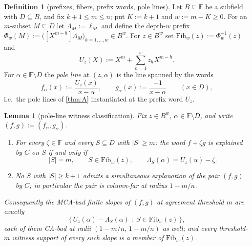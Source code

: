 \documentclass[11pt]{article}
\newtheorem{lemma}[lemma]{Lemma}
\theoremstyle{definition}
\newtheorem{definition}[definition]{Definition}
\theoremstyle{remark}
\newcommand{\F}{\mathbb{F}}
\begin{document}
\begin{definition}[prefixes, fibers, prefix words, pole lines]\label{def:capg-prefix}
Let $B\subseteq\F$ be a subfield with $D\subseteq B$, and fix
$k+1\leq m\leq n$; put $K:=k+1$ and $w:=m-K\geq 0$.  For an $m$-subset
$M\subseteq D$ let $\Lambda_M:=\ell_M$ and define the depth-$w$ prefix
$\Phi_w(M):=\big([X^{m-h}]\Lambda_M\big)_{h=1,\dots,w}\in B^{w}$.  For
$z\in B^{w}$ set $\mathrm{Fib}_w(z):=\Phi_w^{-1}(z)$ and
\[
U_z(X):=X^{m}+\textstyle\sum_{h=1}^{w}z_hX^{m-h}.
\]
For $\alpha\in\F\setminus D$ the \emph{pole line} at $(z,\alpha)$ is the
line spanned by the words
\[
f_\alpha(x):=\frac{U_z(x)}{x-\alpha},\qquad
g_\alpha(x):=\frac{-1}{x-\alpha}\qquad(x\in D),
\]
i.e.\ the pole lines of \cref{thm:A} instantiated at the prefix word $U_z$.
\end{definition}

\begin{lemma}[pole-line witness classification]\label{lem:capg-witness}
Fix $z\in B^{w}$, $\alpha\in\F\setminus D$, and write
$(f,g):=(f_\alpha,g_\alpha)$.
\begin{enumerate}[label=(\roman*)]
\item For every $\zeta\in\F$ and every $S\subseteq D$ with $|S|\geq m$: the
word $f+\zeta g$ is explained by $C$ on $S$ if and only if
\[
|S|=m,\qquad S\in\mathrm{Fib}_w(z),\qquad
\Lambda_S(\alpha)=U_z(\alpha)-\zeta .
\]
\item No $S$ with $|S|\geq k+1$ admits a simultaneous explanation of the
pair $(f,g)$ by $C$; in particular the pair is column-far at radius
$1-m/n$.
\end{enumerate}
Consequently the MCA-bad finite slopes of $(f,g)$ at agreement threshold $m$
are exactly
\[
\big\{\,U_z(\alpha)-\Lambda_S(\alpha)\;:\;S\in\mathrm{Fib}_w(z)\,\big\},
\]
each of them CA-bad at radii $(1-m/n,\,1-m/n)$ as well; and \emph{every}
threshold-$m$ witness support of every such slope is a member of
$\mathrm{Fib}_w(z)$.
\end{lemma}
\end{document}
